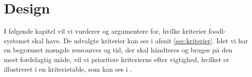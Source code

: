 \chapter{Design}
\label{chap:design}
I følgende kapitel vil vi vurderer og argumentere for, hvilke kriterier foodl-systemet skal have. De udvalgte kriterier kan ses i afsnit \ref{sec:kriterier}. Idet vi har en begrænset mængde ressourcer og tid, der skal håndteres og bruges på den mest fordelagtig måde, vil vi prioritere kriterierne efter vigtighed, hvilket er illustreret i en kriterietable, som kan ses i .


